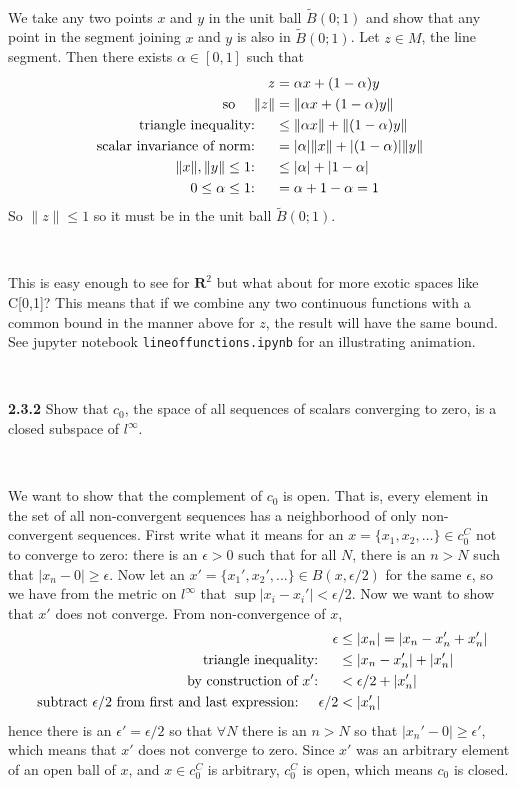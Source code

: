 \documentclass{article}
\newcommand{\R}{\textbf{R}}
\newcommand{\eps}{\epsilon}
\newcommand{\norm}[1]{ \lVert #1 \rVert }
\begin{document}
\

We take any two points $x$ and $y$ in the unit ball $\tilde{B}(0;1)$ 
and show that any point in the segment joining $x$ and $y$ is also
in $\tilde{B}(0;1)$.
Let $z \in M$, the line segment.
Then there exists $\alpha \in [0,1]$ such that
\begin{align*}
  z &= \alpha x + (1-\alpha) y \\
  \text{so \quad} \norm{z} &= \norm{ \alpha x + (1-\alpha) y } \\
  \text{triangle inequality: \quad} & \leq \norm{ \alpha x } + \norm{ (1-\alpha) y } \\
  \text{scalar invariance of norm: \quad} &= |\alpha| \norm{ x } + |(1-\alpha)|  \norm{ y } \\
  \text{$\norm{x}, \norm{y} \leq 1$: \quad} &\leq |\alpha| + |1-\alpha| \\
  \text{$0 \leq \alpha \leq 1$: \quad} & = \alpha + 1 - \alpha = 1
\end{align*}
So $\norm{z} \leq 1$ so it must be in the unit ball $\tilde{B}(0;1)$.

\

This is easy enough to see for $\R^2$ but what about for more exotic
spaces like C[0,1]?
This means that if we combine any two continuous functions with a common bound 
in the manner above for $z$,
the result will have the same bound.
See jupyter notebook \verb+lineoffunctions.ipynb+
for an illustrating animation. 

\

\textbf{2.3.2} Show that $c_0$, the space of all sequences of scalars
converging to zero, is a closed subspace of $l^\infty$. 

\

We want to show that the complement of $c_0$ is open.
That is,
every element in the set of all non-convergent sequences 
has a neighborhood of only non-convergent sequences.
First write what it means for an $x = \{x_1, x_2, \dots\} \in c_0^C$
not to converge to zero: 
there is an $\epsilon > 0$ such that for all $N$,
there is an $n > N$ such that $|x_n-0| \geq \epsilon$.
Now let an $x' = \{x_1', x_2', ...\} \in B(x,\epsilon/2)$
for the same $\epsilon$,
so we have from the metric on $l^\infty$ that 
$\sup |x_i - x_i'| < \epsilon/2 $.
Now we want to show that $x'$ does not converge.
From non-convergence of $x$, 
\begin{align*}
  \epsilon &\leq |x_n| = |x_n - x_n' + x_n'| \\
  \text{ triangle inequality: \quad} &\leq |x_n - x_n'| + |x_n'| \\
  \text{ by construction of $x'$: \quad} &< \eps/2 + |x_n'| \\
  \text{ subtract $\epsilon$/2 from first and last expression: \quad}
  \epsilon/2 &< |x_n'|
\end{align*}
hence there is an $\eps' = \eps/2$ so that $\forall N$ there is an $n>N$
so that $|x_n' - 0| \geq \eps'$, 
which means that $x'$ does not converge to zero. 
Since $x'$ was an arbitrary element of an open ball of $x$,
and $x\in c_0^C$ is arbitrary,
$c_0^C$ is open, 
which means $c_0$ is closed.
\end{document}
